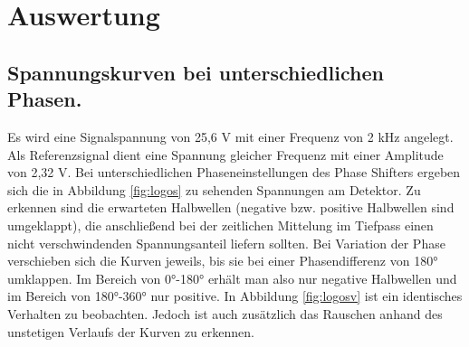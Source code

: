 \section{Auswertung}
\label{sec:Auswertung}

\subsection{Spannungskurven bei unterschiedlichen Phasen.}
Es wird eine Signalspannung von 25,6 V mit einer Frequenz von 2 kHz angelegt. Als
Referenzsignal dient eine Spannung gleicher Frequenz mit einer Amplitude von
2,32 V.
Bei unterschiedlichen Phaseneinstellungen des Phase Shifters ergeben sich
die in Abbildung \ref{fig:logos} zu sehenden Spannungen am Detektor.
Zu erkennen sind die erwarteten Halbwellen (negative bzw. positive Halbwellen sind umgeklappt),
die anschließend bei der zeitlichen Mittelung im Tiefpass einen nicht verschwindenden
Spannungsanteil liefern sollten.
Bei Variation der Phase verschieben sich die Kurven jeweils,
bis sie bei einer Phasendifferenz von 180° umklappen. Im Bereich von 0°-180° erhält
man also nur negative Halbwellen und im Bereich von 180°-360° nur positive.
In Abbildung \ref{fig:logosv} ist ein identisches Verhalten zu beobachten.
Jedoch ist auch zusätzlich das Rauschen anhand des unstetigen Verlaufs der Kurven zu
erkennen.

